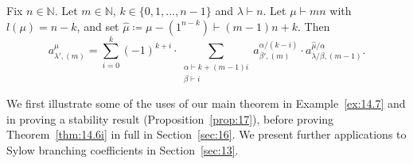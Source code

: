 \documentclass[ALCO, Unicode]{cedram}
\newcommand{\N}{\mathbb{N}}
\begin{document}
\begin{theorem}[Theorem A]\label{thm:14.6i}
	Fix $n\in\N$. Let $m\in\N$, $k\in\{0,1,\dotsc,n-1\}$ and $\lambda\vdash n$. Let $\mu\vdash mn$ with $l(\mu)=n-k$, and set $\hat{\mu}\coloneqq \mu-(1^{n-k})\vdash (m-1)n+k$. Then
	\begin{equation}\label{eqn:A}
		a^\mu_{\lambda',(m)} = \sum_{i=0}^k (-1)^{k+i} \cdot \sum_{\substack{\alpha\vdash k+(m-1)i\\\beta\vdash i}} a^{\alpha/(k-i)}_{\beta',(m)}\cdot a^{\hat{\mu}/\alpha}_{\lambda/\beta,(m-1)}.
	\end{equation}
\end{theorem}

We first illustrate some of the uses of our main theorem in Example~\ref{ex:14.7} and in proving a stability result (Proposition~\ref{prop:17}), before proving Theorem~\ref{thm:14.6i} in full in Section~\ref{sec:16}. We present further applications to Sylow branching coefficients in Section~\ref{sec:13}.
\end{document}
